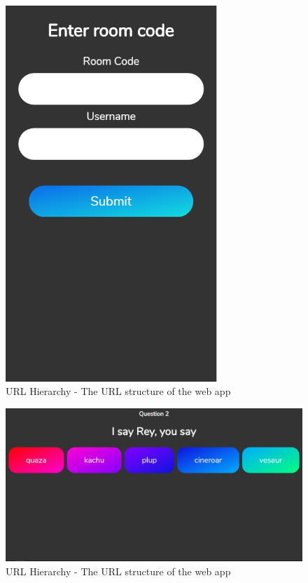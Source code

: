 \documentclass[10pt, a4paper]{article}
\begin{document}
\begin{figure}
\includegraphics[width=8cm]{enterScreen.PNG}
\caption[width=10cm]{URL Hierarchy - The URL structure of the web app} \label{enterScreen}
\end{figure}

\begin{figure}
\includegraphics[width=\textwidth]{quizScreen.PNG}
\caption[width=\textwidth]{URL Hierarchy - The URL structure of the web app} \label{quizScreen}
\end{figure}
\end{document}
